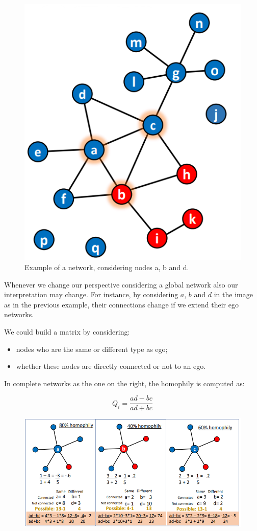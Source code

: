 \documentclass[
  notitlepage,
  onecolumn,
  openany]{book}
\providecommand{\tightlist}{%
  \setlength{\itemsep}{0pt}\setlength{\parskip}{0pt}}
\begin{document}
\begin{figure}[h!]

{\centering \includegraphics[width=0.3\linewidth]{images/06-Attributes based measures/Untitled 3} 

}

\caption{Example of a network, considering nodes a, b and d.}\label{fig:unnamed-chunk-39}
\end{figure}

Whenever we change our perspective considering a global network also our interpretation may change. For instance, by considering \(a\), \(b\) and \(d\) in the image as in the previous example, their connections change if we extend their ego networks.

We could build a matrix by considering:

\begin{itemize}
\tightlist
\item
  nodes who are the same or different type as ego;
\item
  whether these nodes are directly connected or not to an ego.
\end{itemize}

In complete networks as the one on the right, the homophily is computed as:

\[
Q_i = \frac{ad-bc}{ad+bc}
\]

\begin{figure}[h!]

{\centering \includegraphics[width=0.8\linewidth]{images/06-Attributes based measures/Untitled 4} 

}

\end{figure}
\end{document}
